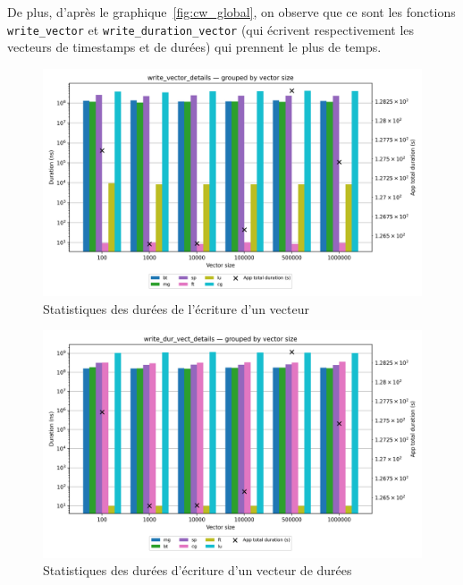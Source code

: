 De plus, d'après le graphique~\ref{fig:cw_global}, on observe que ce sont les fonctions \verb!write_vector! et \verb!write_duration_vector! (qui écrivent respectivement les vecteurs de timestamps et de durées)
qui prennent le plus de temps.\\
\begin{figure}[!h]
    \centering
    \includegraphics[width=1\textwidth]{img/write_vector_details.png}
    \caption{Statistiques des durées de l'écriture d'un vecteur}
    \label{fig:a}
\end{figure}
\begin{figure}[!h]
    \centering
    \includegraphics[width=1\textwidth]{img/write_dur_vect_details.png}
    \caption{Statistiques des durées d'écriture d'un vecteur de durées}
    \label{fig:b}
\end{figure}
